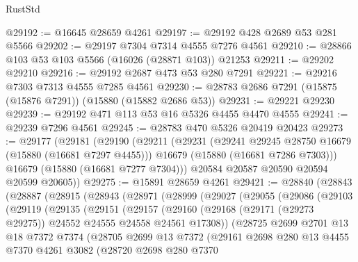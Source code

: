 \begin{lexlean}{RustStd}
\begin{coremodule}
@29192 := @16645 @28659 @4261
@29197 := @29192 @428 @2689 @53 @281 @5566
@29202 := @29197 @7304 @7314 @4555 @7276 @4561
@29210 := @28866 @103 @53 @103 @5566 (@16026 (@28871 @103)) @21253
@29211 := @29202 @29210
@29216 := @29192 @2687 @473 @53 @280 @7291
@29221 := @29216 @7303 @7313 @4555 @7285 @4561
@29230 := @28783 @2686 @7291 (@15875 (@15876 @7291)) (@15880 (@15882 @2686 @53))
@29231 := @29221 @29230
@29239 := @29192 @471 @113 @53 @16 @5326 @4455 @4470 @4555
@29241 := @29239 @7296 @4561
@29245 := @28783 @470 @5326 @20419 @20423
@29273 := @29177
    (@29181
      (@29190
        (@29211
          (@29231
            (@29241 @29245 @28750 @16679 (@15880 (@16681 @7297 @4455)))
            @16679
            (@15880 (@16681 @7286 @7303)))
          @16679
          (@15880 (@16681 @7277 @7304)))
        @20584
        @20587
        @20590
        @20594
        @20599
        @20605))
@29275 := @15891 @28659 @4261
@29421 := @28840
    (@28843
      (@28887
        (@28915
          (@28943
            (@28971
              (@28999
                (@29027
                  (@29055
                    (@29086
                      (@29103
                        (@29119
                          (@29135
                            (@29151
                              (@29157
                                (@29160
                                  (@29168
                                    (@29171 (@29273 @29275))
                                    @24552
                                    @24555
                                    @24558
                                    @24561
                                    @17308))
                                (@28725
                                  @2699
                                  @2701
                                  @13
                                  @18
                                  @7372
                                  @7374
                                  (@28705
                                    @2699
                                    @13
                                    @7372
                                    (@29161
                                      @2698
                                      @280
                                      @13
                                      @4455
                                      @7370
                                      @4261
                                      @3082
                                      (@28720
                                        @2698
                                        @280
                                        @7370

\end{coremodule}
\end{lexlean}
